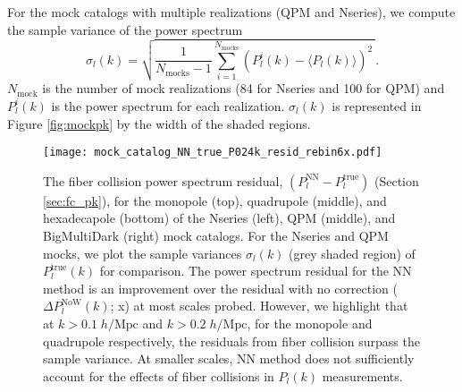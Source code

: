 For the mock catalogs with multiple realizations (QPM and Nseries), we 
compute the sample variance of the power spectrum
\begin{equation} \label{eq:pk_var}
\sigma_l (k)= \sqrt{\frac{1}{N_\mathrm{mocks}-1} \sum\limits_{i=1}^{N_\mathrm{mocks}} (P^i_l(k)- \langle{P_l(k)}\rangle)^2 \ }. 
\end{equation}
$N_\mathrm{mock}$ is the number of mock realizations (84 for Nseries and 100 for 
QPM) and $P^i_l(k)$ is the power spectrum for each realization. $\sigma_l(k)$ is 
represented in Figure \ref{fig:mockpk} by the width of the shaded regions. 
\begin{figure*}
\begin{center}
\texttt{[image: mock\_catalog\_NN\_true\_P024k\_resid\_rebin6x.pdf]} 
\caption{The fiber collision power spectrum residual, 
$(P_l^\mathrm{NN}-P_l^\mathrm{true})$ 
(Section \ref{sec:fc_pk}), for the monopole (top), quadrupole 
(middle), and hexadecapole (bottom) of the Nseries (left), QPM (middle), and 
BigMultiDark (right) mock catalogs. For the Nseries and QPM mocks, 
we plot the sample variances $\sigma_l(k)$ (grey shaded region) of 
$P_l^\mathrm{true}(k)$ for comparison. The power spectrum residual for the 
NN method is an improvement over the residual with no correction 
($\Delta P_l^\mathrm{NoW}(k)$; x) at most scales probed. 
However, we highlight that at $k > 0.1 \;h/\mathrm{Mpc}$ and 
$k > 0.2\;h/\mathrm{Mpc}$, for the monopole and quadrupole 
respectively, the residuals from fiber collision surpass the sample 
variance. 
At smaller scales, NN method does not sufficiently account for 
the effects of fiber collisions in $P_l(k)$ measurements.}
\label{fig:fc_pk}
\end{center}
\end{figure*}

